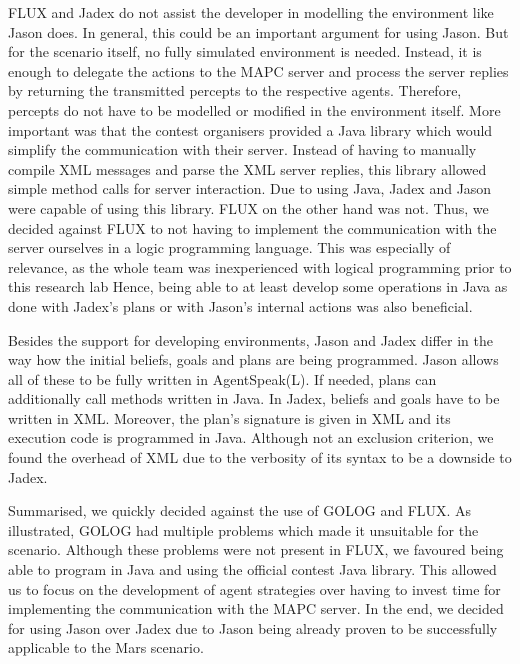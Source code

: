 FLUX and Jadex do not assist the developer in modelling the environment like Jason does.
In general, this could be an important argument for using Jason.
But for the \mars scenario itself, no fully simulated environment is needed.
Instead, it is enough to delegate the actions to the MAPC server and process the server replies by returning the transmitted percepts to the respective agents.
Therefore, percepts do not have to be modelled or modified in the environment itself.
More important was that the contest organisers provided a Java library which would simplify the communication with their server.
Instead of having to manually compile XML messages and parse the XML server replies, this library allowed simple method calls for server interaction.
Due to using Java, Jadex and Jason were capable of using this library.
FLUX on the other hand was not.
Thus, we decided against FLUX to not having to implement the communication with the server ourselves in a logic programming language.
This was especially of relevance, as the whole team was inexperienced with logical programming prior to this research lab
Hence, being able to at least develop some operations in Java as done with Jadex's plans or with Jason's internal actions was also beneficial.

Besides the support for developing environments, Jason and Jadex differ in the way how the initial beliefs, goals and plans are being programmed.
Jason allows all of these to be fully written in AgentSpeak(L).
If needed, plans can additionally call methods written in Java.
In Jadex, beliefs and goals have to be written in XML.
Moreover, the plan's signature is given in XML and its execution code is programmed in Java.
Although not an exclusion criterion, we found the overhead of XML due to the verbosity of its syntax to be a downside to Jadex.

Summarised, we quickly decided against the use of GOLOG and FLUX.
As illustrated, GOLOG had multiple problems which made it unsuitable for the \mars scenario.
Although these problems were not present in FLUX, we favoured being able to program in Java and using the official contest Java library.
This allowed us to focus on the development of agent strategies over having to invest time for implementing the communication with the MAPC server.
In the end, we decided for using Jason over Jadex due to Jason being already proven to be successfully applicable to the Mars scenario.
